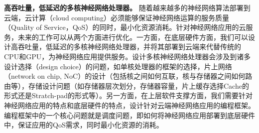 \textbf{高吞吐量，低延迟的多核神经网络处理器。}
随着越来越多的神经网络算法部署到云端，云计算（cloud computing）必须能够保证神经网络运算的服务质量（Quality of Service，QoS）的同时，最小化资源消耗。针对神经网络应用的云服务，未来的工作可以从两个方面进行优化。一方面，在底层硬件方面，我们可以设计高吞吐量，低延迟的多核神经网络处理器，并将其部署到云端来代替传统的CPU和GPU，为神经网络应用提供服务。设计多核神经网络处理器会涉及到诸多设计选择（design choice）的问题，如单核处理器的框架的选择，片上网络（network on chip, NoC）的设计（包括核之间如何互联，核与存储器之间如何路由等），存储设计问题（如存储器层次划分，存储器容量，片上缓存选择Cache的形式还是Stratch-pad的形式等）。另一方面，在上层软件支撑方面，我们需要针对神经网络应用的特点和底层硬件的特点，设计针对云端神经网络应用的编程框架。编程框架中的一个核心问题就是调度问题，即如何将神经网络应用部署到底层硬件中，保证应用的QoS需求，同时最小化资源的消耗。


